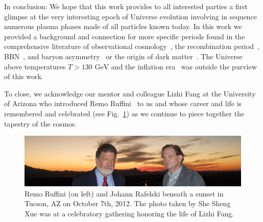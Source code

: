 \documentclass[universe,article,submit,moreauthors,pdftex,a4paper]{Definitions/mdpi}
\newcommand{\GeV}{\text{ GeV}}
\newcommand*{\rf}[1]{Fig.~{\ref{#1}}}
\begin{document}
In conclusion: We hope that this work provides to all interested parties a first glimpse at the very interesting epoch of Universe evolution involving in sequence numerous plasma phases made of all particles known today. In this work we provided a background and connection for more specific periods found in the comprehensive literature of observational cosmology~\cite{Davis:1985rj,Navarro:1995iw,Moore:1999nt,Springel:2005nw,Demianski:2015xye,Arbey:2021gdg}, the recombination period~\cite{Planck:2018vyg,Planck:2018nkj}, BBN~\cite{Steigman:2007xt,Cyburt:2015mya,Pitrou:2018cgg}, and baryon asymmetry~\cite{Kuzmin:1985mm,Canetti:2012zc,ParticleDataGroup:2022pth} or the origin of dark matter~\cite{Bertone:2004pz,Peccei:2006as,Wantz:2009it}. The Universe above temperatures $T>130 \GeV$ and the inflation era~\cite{Baumann:2009ds,Allahverdi:2020bys} was outside the purview of this work.

To close, we acknowledge our mentor and colleague Lizhi Fang at the University of Arizona who introduced Remo Ruffini~\cite{fang1984cosmology,fang1985galaxies,fang1987quantum} to us and whose career and life is remembered and celebrated (see \rf{remo_sunset}) as we continue to piece together the tapestry of the cosmos.

\begin{figure}[ht]
\centering
\includegraphics[width=\textwidth]{./plots/remo_sunset.PNG}
\caption{Remo Ruffini (on left) and Johann Rafelski beneath a sunset in Tucson, AZ on October 7th, 2012. The photo taken by She Sheng Xue was at a celebratory gathering honoring the life of Lizhi Fang.}
\label{remo_sunset}
\end{figure}

%

\end{document}
